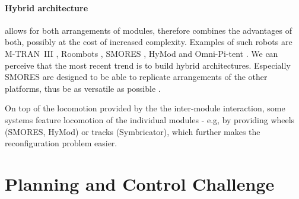 \paragraph{Hybrid architecture} allows for both arrangements of modules,
therefore combines the advantages of both, possibly at the cost of increased
complexity. Examples of such robots are M-TRAN~III
\cite{DBLP:journals/ijrr/KurokawaTKKHM08}, Roombots
\cite{DBLP:conf/icra/SprowitzBDI09}, SMORES \cite{DBLP:conf/iros/DaveyKY12},
HyMod \cite{DBLP:conf/dars/ParrottDG16} and Omni-Pi-tent
\cite{DBLP:conf/taros/PeckTT19}. We can perceive that the most recent trend is
to build hybrid architectures. Especially SMORES are designed to be able to
replicate arrangements of the other platforms, thus be as versatile as possible
\cite{DBLP:conf/iros/DaveyKY12}.

On top of the locomotion provided by the the inter-module interaction, some
systems feature locomotion of the individual modules - e.g, by providing wheels
(SMORES, HyMod) or tracks (Symbricator), which further makes the reconfiguration
problem easier.

\section{Planning and Control Challenge}














